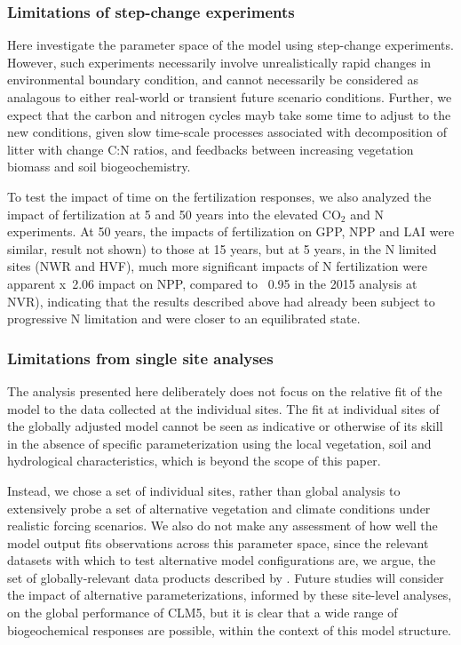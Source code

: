 \documentclass[draft,linenumbers]{agujournal}
\begin{document}
\subsubsection{Limitations of step-change experiments}
Here investigate the parameter space of the model using step-change experiments. However, such experiments necessarily involve unrealistically rapid changes in environmental boundary condition, and cannot necessarily be considered as analagous to either real-world or transient future scenario conditions. Further, we expect that the carbon and nitrogen cycles mayb take some time to adjust to the new conditions, given slow time-scale processes associated with decomposition of litter with change C:N ratios, and feedbacks between increasing vegetation biomass and soil biogeochemistry.

To test the impact of time on the fertilization responses, we also analyzed the impact of fertilization at 5 and 50 years into the elevated CO$_{2}$ and N experiments. At 50 years, the impacts of fertilization on GPP, NPP and LAI were similar, result not shown) to those at 15 years, but at 5 years, in the N limited sites (NWR and HVF), much more significant impacts of N fertilization were apparent x~2.06 impact on NPP, compared to ~0.95 in the 2015 analysis at NVR), indicating that the results described above had already been subject to progressive N limitation and were closer to an equilibrated state.

\subsubsection{Limitations from single site analyses}
The analysis presented here deliberately does not focus on the relative fit of the model to the data collected at the individual sites. The fit at individual sites of the globally adjusted model cannot be seen as indicative or otherwise of its skill in the absence of specific parameterization using the local vegetation, soil and hydrological characteristics, which is beyond the scope of this paper.

Instead, we chose a set of individual sites, rather than global analysis to extensively probe a set of alternative vegetation and climate conditions under realistic forcing scenarios.  We also do not make any assessment of how well the model output fits observations across this parameter space, since the relevant datasets with which to test alternative model configurations are, we argue, the set of globally-relevant data products described by \cite{lawrence2018}. Future studies will consider the impact of alternative parameterizations, informed by these site-level analyses, on the global performance of CLM5, but it is clear that a wide range of biogeochemical responses are possible, within the context of this model structure.  
\end{document}
